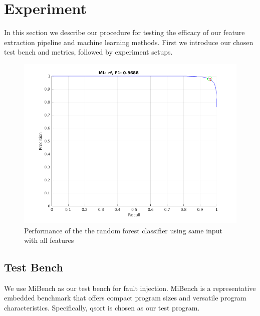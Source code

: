 \section{Experiment}
In this section we describe our procedure for testing the efficacy of our feature extraction pipeline and machine learning methods. First we introduce our chosen test bench and metrics, followed by experiment setups.

\begin{figure}[t]
\begin{center}
   \includegraphics[width=0.8\linewidth]{./figures/siaf.png}
\end{center}
   \vspace{-0.5cm}
   \caption{Performance of the the random forest classifier using same input with all features}
   \vspace{-0.3cm}
\label{fig:siaf}
\end{figure}

\subsection{Test Bench}
We use MiBench \cite{guthaus2001mibench} as our test bench for fault injection. MiBench is a representative embedded benchmark that offers compact program sizes and versatile program characteristics. Specifically, qsort is chosen as our test program.


